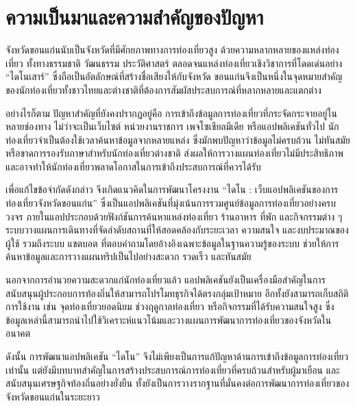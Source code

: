 
\section{ความเป็นมาและความสำคัญของปัญหา}

จังหวัดขอนแก่นนับเป็นจังหวัดที่มีศักยภาพทางการท่องเที่ยวสูง ด้วยความหลากหลายของแหล่งท่องเที่ยว ทั้งทางธรรมชาติ วัฒนธรรม ประวัติศาสตร์ ตลอดจนแหล่งท่องเที่ยวเชิงวิชาการที่โดดเด่นอย่าง ``ไดโนเสาร์'' ซึ่งถือเป็นอัตลักษณ์ที่สร้างชื่อเสียงให้กับจังหวัด ขอนแก่นจึงเป็นหนึ่งในจุดหมายสำคัญของนักท่องเที่ยวทั้งชาวไทยและต่างชาติที่ต้องการสัมผัสประสบการณ์ที่หลากหลายและแตกต่าง

อย่างไรก็ตาม ปัญหาสำคัญที่ยังคงปรากฏอยู่คือ การเข้าถึงข้อมูลการท่องเที่ยวที่กระจัดกระจายอยู่ในหลายช่องทาง ไม่ว่าจะเป็นเว็บไซต์ หน่วยงานราชการ เพจโซเชียลมีเดีย หรือแอปพลิเคชันทั่วไป นักท่องเที่ยวจำเป็นต้องใช้เวลาค้นหาข้อมูลจากหลายแหล่ง ซึ่งมักพบปัญหาว่าข้อมูลไม่ครบถ้วน ไม่ทันสมัย หรือขาดการรองรับภาษาสำหรับนักท่องเที่ยวต่างชาติ ส่งผลให้การวางแผนท่องเที่ยวไม่มีประสิทธิภาพและอาจทำให้นักท่องเที่ยวพลาดโอกาสในการเข้าถึงประสบการณ์ที่ควรได้รับ

เพื่อแก้ไขข้อจำกัดดังกล่าว จึงเกิดแนวคิดในการพัฒนาโครงงาน ``ไดโน : เว็บแอปพลิเคชันของการท่องเที่ยวจังหวัดขอนแก่น'' ซึ่งเป็นแอปพลิเคชันที่มุ่งเน้นการรวมศูนย์ข้อมูลการท่องเที่ยวอย่างครบวงจร ภายในแอปประกอบด้วยฟังก์ชันการค้นหาแหล่งท่องเที่ยว ร้านอาหาร ที่พัก และกิจกรรมต่าง ๆ ระบบวางแผนการเดินทางที่จัดลำดับสถานที่ให้สอดคล้องกับระยะเวลา ความสนใจ และงบประมาณของผู้ใช้ รวมถึงระบบ แชตบอต ที่ตอบคำถามโดยอ้างอิงเฉพาะข้อมูลในฐานความรู้ของระบบ ช่วยให้การค้นหาข้อมูลและการวางแผนทริปเป็นไปอย่างสะดวก รวดเร็ว และทันสมัย

นอกจากการอำนวยความสะดวกแก่นักท่องเที่ยวแล้ว แอปพลิเคชันยังเป็นเครื่องมือสำคัญในการสนับสนุนผู้ประกอบการท้องถิ่นให้สามารถโปรโมทธุรกิจได้ตรงกลุ่มเป้าหมาย อีกทั้งยังสามารถเก็บสถิติการใช้งาน เช่น จุดท่องเที่ยวยอดนิยม ช่วงฤดูกาลท่องเที่ยว หรือกิจกรรมที่ได้รับความสนใจสูง ซึ่งข้อมูลเหล่านี้สามารถนำไปใช้วิเคราะห์แนวโน้มและวางแผนการพัฒนาการท่องเที่ยวของจังหวัดในอนาคต

ดังนั้น การพัฒนาแอปพลิเคชัน ``ไดโน'' จึงไม่เพียงเป็นการแก้ปัญหาด้านการเข้าถึงข้อมูลการท่องเที่ยวเท่านั้น แต่ยังมีบทบาทสำคัญในการสร้างประสบการณ์การท่องเที่ยวที่ครบถ้วนสำหรับผู้มาเยือน และสนับสนุนเศรษฐกิจท้องถิ่นอย่างยั่งยืน ทั้งยังเป็นการวางรากฐานที่มั่นคงต่อการพัฒนาการท่องเที่ยวของจังหวัดขอนแก่นในระยะยาว

